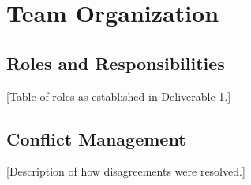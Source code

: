 \section{Team Organization}
\subsection{Roles and Responsibilities}
[Table of roles as established in Deliverable 1.]

\subsection{Conflict Management}
[Description of how disagreements were resolved.]
